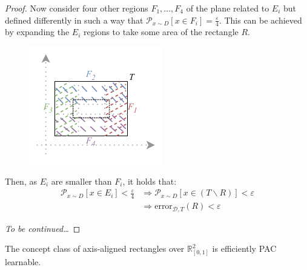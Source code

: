\begin{theorem}
\begin{proof}
        Now consider four other regions $F_1, \dots, F_4$ of the plane related to $E_i$ but defined differently
        in such a way that $\mathcal{P}_{x \sim D}[x \in F_i] = \frac{\varepsilon}{4}$.
        This can be achieved by expanding the $E_i$ regions to take some area of the rectangle $R$.
        \begin{figure}[H]
            \centering
            \includegraphics[width=0.4\linewidth]{./img/_rectangle_space2.pdf}
        \end{figure}

        Then, as $E_i$ are smaller than $F_i$, it holds that:
        \[ 
            \begin{split}
                \mathcal{P}_{x \sim D}[x \in E_i] < \frac{\varepsilon}{4} &\Rightarrow \mathcal{P}_{x \sim D}[x \in (T \smallsetminus R)] < \varepsilon \\
                & \Rightarrow \text{error}_{\mathcal{D}, T}(R) < \varepsilon
            \end{split}
        \]
        
        \textit{To be continued\dots}
    \end{proof}
\end{theorem}


\begin{corollary}
    The concept class of axis-aligned rectangles over $\mathbb{R}^2_{[0, 1]}$ is efficiently PAC learnable.
\end{corollary}